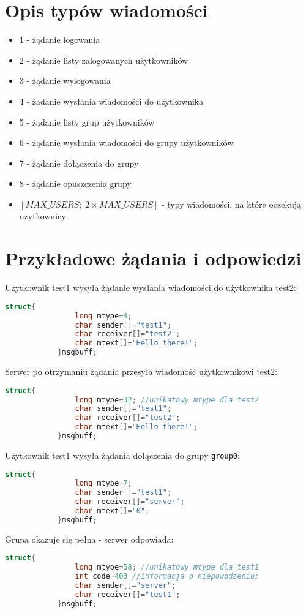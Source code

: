 \documentclass{article}
\begin{document}
	\section{Opis typów wiadomości}
	\begin{itemize}
		\item 1 - żądanie logowania
		\item 2 - żądanie listy zalogowanych użytkowników
		\item 3 - żądanie wylogowania
		\item 4 - żadanie wysłania wiadomości do użytkownika
		\item 5 - żądanie listy grup użytkowników
		\item 6 - żądanie wysłania wiadomości do grupy użytkowników
		\item 7 - żądanie dołączenia do grupy
		\item 8 - żądanie opuszczenia grupy
		\item $\left[MAX\_USERS; \; 2\times MAX\_USERS\right]$ - typy wiadomości, na które oczekują użytkownicy
	\end{itemize}

	\section{Przykładowe żądania i odpowiedzi}
		Użytkownik test1 wysyła żądanie wysłania wiadomości do użytkownika test2:
		\begin{lstlisting}[language=C]
			struct{
				long mtype=4;
				char sender[]="test1";
				char receiver[]="test2";
				char mtext[]="Hello there!";
			}msgbuff;
		\end{lstlisting}

		Serwer po otrzymaniu żądania przesyła wiadomość użytkownikowi test2:
		\begin{lstlisting}[language=C]
			struct{
				long mtype=32; //unikatowy mtype dla test2 
				char sender[]="test1";
				char receiver[]="test2";
				char mtext[]="Hello there!";
			}msgbuff;
		\end{lstlisting}
		\newpage
		\noindent Użytkownik test1 wysyła żądania dołączenia do grupy \verb+group0+:
		\begin{lstlisting}[language=C]
			struct{
				long mtype=7;
				char sender[]="test1";
				char receiver[]="server";
				char mtext[]="0";
			}msgbuff;
		\end{lstlisting}
		Grupa okazuje się pełna - serwer odpowiada:
		\begin{lstlisting}[language=C]
			struct{
				long mtype=58; //unikatowy mtype dla test1
				int code=403 //informacja o niepowodzeniu;
				char sender[]="server";
				char receiver[]="test1";
			}msgbuff;
		\end{lstlisting}
\end{document}
